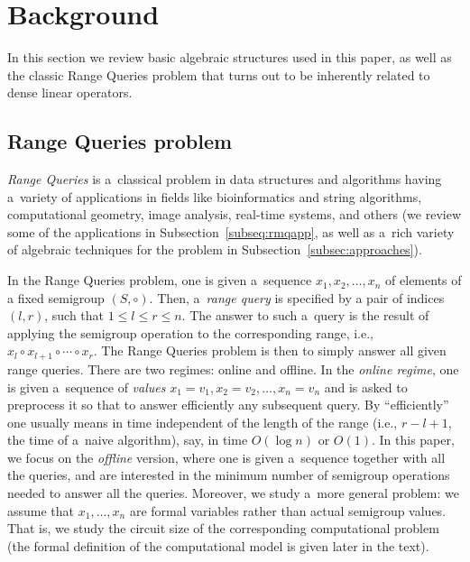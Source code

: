 \documentclass[11pt,letterpaper]{article}
\begin{document}
\section{Background}\label{sec-background}

In this section we review basic algebraic structures used in this paper, as well
as the classic Range Queries problem that turns out to be inherently related to
dense linear operators.



\subsection{Range Queries problem}
{\em Range Queries} is a~classical problem in data structures and algorithms
having a~variety of applications in fields like bioinformatics and string
algorithms, computational geometry, image analysis, real-time systems, and
others (we review some of the applications in Subsection~\ref{subseq:rmqapp}, as
well as a~rich variety of algebraic techniques for the problem in
Subsection~\ref{subsec:approaches}).

In the Range Queries problem, one is given a~sequence $x_1, x_2, \dotsc, x_n$ of
elements of a fixed semigroup $(S, \circ)$. Then, a~\emph{range query} is
specified by a pair of indices $(l,r)$, such that $1 \le l \le r \le n$. The
answer to such a~query is the result of applying the semigroup operation to the
corresponding range, i.e., $x_l \circ x_{l+1} \circ \dotsb \circ x_r$. The Range
Queries problem is then to simply answer all given range queries. There are two
regimes: online and offline. In the {\em online regime}, one is given
a~sequence of {\em values} $x_1=v_1, x_2=v_2, \dotsc, x_n=v_n$ and is asked to preprocess it so that to
answer efficiently any subsequent query. By ``efficiently'' one usually
means in time independent of the length of the range (i.e., $r-l+1$, the time
of a~naive algorithm), say, in time $O(\log n)$ or $O(1)$. In this paper, we
focus on the {\em offline} version, where one is given a~sequence together with
all the queries, and are interested in the minimum number of semigroup
operations needed to answer all the queries. Moreover, we study a~more general
problem: we assume that $x_1, \dotsc, x_n$ are formal variables rather than
actual semigroup values. That is, we study the circuit size of the corresponding
computational problem (the formal definition of the computational model is given
later in the text).

\end{document}
